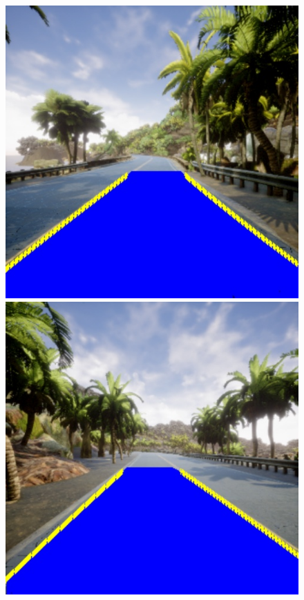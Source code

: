 \begin{figure}[H]
  \begin{minipage}[t]{0.2\textwidth}
      \centering
      \includegraphics[width=\textwidth]{figs/Diseño/Regresiones/interpolación1.jpg}
      \caption*{}
  \end{minipage}
  \hfill
  \begin{minipage}[t]{0.2\textwidth}
      \centering
      \includegraphics[width=\textwidth]{figs/Diseño/Regresiones/interpolación2.jpg}

\end{minipage}
\end{figure}
